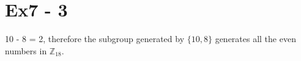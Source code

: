 \section*{Ex7 - 3}
10 - 8 = 2, therefore the subgroup generated by $ \{10, 8\} $ generates all the even numbers in $ \mathbb{Z}_{18} $.